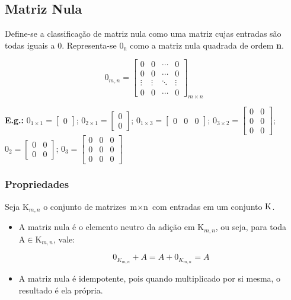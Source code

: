 \documentclass[a4paper,12pt]{article}
\begin{document}
\subsection{Matriz Nula}

Define-se a classificação de matriz nula como uma matriz cujas entradas são todas iguais a 0. Representa-se $ \text{0}_{\text{n}} $ como a matriz nula quadrada de ordem \textbf{n}.

$$ 
0_{m,n} = \begin{bmatrix}
0 & 0 & \cdots & 0 \\
0 & 0 & \cdots & 0 \\
\vdots & \vdots & \ddots & \vdots \\
0 & 0 & \cdots & 0 \end{bmatrix}_{m \times n} $$

\textbf{E.g.:} $ \text{0}_{1 \times 1} = \begin{bmatrix}
0
\end{bmatrix} $; $ \text{0}_{2 \times 1} = \begin{bmatrix}
0 \\
0
\end{bmatrix} $; $ \text{0}_{1 \times 3} = \begin{bmatrix}
0 & 0 & 0
\end{bmatrix} $; $ \text{0}_{3 \times 2} = \begin{bmatrix}
0 & 0 \\
0 & 0 \\
0 & 0 
\end{bmatrix} $; $ \text{0}_{2} = \begin{bmatrix}
0 & 0 \\
0 & 0
\end{bmatrix} $; $ \text{0}_{3} = \begin{bmatrix}
0 & 0 & 0 \\
0 & 0 & 0 \\
0 & 0 & 0
\end{bmatrix} $

\subsubsection{Propriedades}

Seja $ \text{K}_{m,n} $ o conjunto de matrizes $ \text{m} \times \text{n} $ com entradas em um conjunto $ \text K $.

\begin{itemize}
    \item A matriz nula é o elemento neutro da adição em $ \text{K}_{m,n} $, ou seja, para toda $ \text{A} \in \text{K}_{m,n} $, vale:
    
    $$ 0_{K_{m,n}}+A = A + 0_{K_{m,n}} = A $$
    
    \item A matriz nula é idempotente, pois quando multiplicado por si mesma, o resultado é ela própria.
    
\end{itemize}
\end{document}
